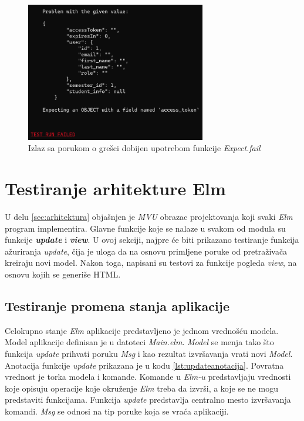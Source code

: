 \documentclass[12pt,oneside]{memoir}
\begin{document}
\begin{figure}[!ht]
  \centering
  \includegraphics[width=0.7\textwidth]{expfail.png}
  \caption{Izlaz sa porukom o grešci dobijen upotrebom funkcije \emph{Expect.fail}}
  \label{fig:expfail}
\end{figure}

\section{Testiranje arhitekture Elm}
\par U delu \ref{sec:arhitektura} objašnjen je \emph{MVU} obrazac projektovanja koji svaki \emph{Elm} program implementira. Glavne funkcije koje se nalaze u svakom od modula su funkcije \textbf{\emph{update}} i \emph{\textbf{view}}. U ovoj sekciji, najpre će biti prikazano testiranje funkcija ažuriranja \emph{update}, čija je uloga da na osnovu primljene poruke od pretraživača kreiraju novi model. Nakon toga, napisani su testovi za funkcije pogleda \emph{view}, na osnovu kojih se generiše HTML.

\subsection{Testiranje promena stanja aplikacije}

\par Celokupno stanje \emph{Elm} aplikacije predstavljeno je jednom vrednošću modela. Model aplikacije definisan je u datoteci \emph{Main.elm}. \emph{Model} se menja tako što funkcija \emph{update} prihvati poruku \emph{Msg} i kao rezultat izvršavanja vrati novi \emph{Model}. Anotacija funkcije \emph{update} prikazana je u kodu \ref{lst:updateanotacija}. Povratna vrednost je torka modela i komande.  Komande u \emph{Elm-u} predstavljaju vrednosti koje opisuju operacije koje okruženje \emph{Elm} treba da izvrši, a koje se ne mogu predstaviti funkcijama. Funkcija \emph{update} predstavlja centralno mesto izvršavanja komandi. \emph{Msg} se odnosi na tip poruke koja se vraća aplikaciji. 
\end{document}
